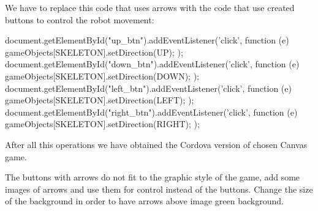 We have to replace this code that uses arrows with the code that use created buttons to control the robot movement:

\begin{js}
document.getElementById("up_btn").addEventListener('click', function (e){
		gameObjects[SKELETON].setDirection(UP);
	});
document.getElementById("down_btn").addEventListener('click', function (e){
		gameObjects[SKELETON].setDirection(DOWN);
	});
document.getElementById("left_btn").addEventListener('click', function (e){
		gameObjects[SKELETON].setDirection(LEFT);
	});
document.getElementById("right_btn").addEventListener('click', function (e){
		gameObjects[SKELETON].setDirection(RIGHT);
	});
\end{js}

After all this operations we have obtained the Cordova version of chosen Canvas game.

\begin{extercises}
  The buttons with arrows do not fit to the graphic style of the game, add some images of arrows and use them for control instead of the buttons.
  Change the size of the background in order to have arrows above image green background.
\end{extercises}




